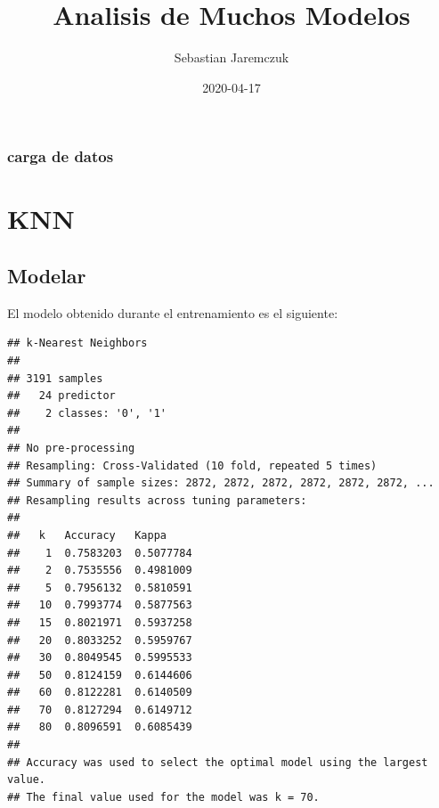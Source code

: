 \documentclass[]{article}
\title{Analisis de Muchos Modelos}
\author{Sebastian Jaremczuk}
\date{2020-04-17}
\begin{document}
\maketitle

\hypertarget{carga-de-datos}{%
\subsubsection{carga de datos}\label{carga-de-datos}}

\hypertarget{knn}{%
\section{KNN}\label{knn}}

\hypertarget{modelar}{%
\subsection{Modelar}\label{modelar}}

El modelo obtenido durante el entrenamiento es el siguiente:

\begin{lstlisting}
## k-Nearest Neighbors 
## 
## 3191 samples
##   24 predictor
##    2 classes: '0', '1' 
## 
## No pre-processing
## Resampling: Cross-Validated (10 fold, repeated 5 times) 
## Summary of sample sizes: 2872, 2872, 2872, 2872, 2872, 2872, ... 
## Resampling results across tuning parameters:
## 
##   k   Accuracy   Kappa    
##    1  0.7583203  0.5077784
##    2  0.7535556  0.4981009
##    5  0.7956132  0.5810591
##   10  0.7993774  0.5877563
##   15  0.8021971  0.5937258
##   20  0.8033252  0.5959767
##   30  0.8049545  0.5995533
##   50  0.8124159  0.6144606
##   60  0.8122281  0.6140509
##   70  0.8127294  0.6149712
##   80  0.8096591  0.6085439
## 
## Accuracy was used to select the optimal model using the largest value.
## The final value used for the model was k = 70.
\end{lstlisting}
\end{document}
